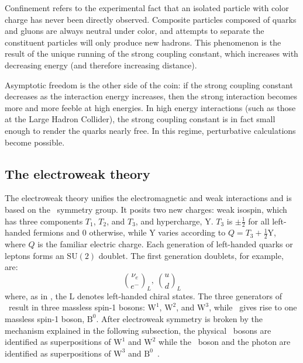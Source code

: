 Confinement refers to the experimental fact that an isolated particle with color charge has never been directly observed. Composite particles composed of quarks and gluons are always neutral under color, and attempts to separate the constituent particles will only produce new hadrons. This phenomenon is the result of the unique running of the strong coupling constant, which increases with decreasing energy (and therefore increasing distance).    

Asymptotic freedom is the other side of the coin: if the strong coupling constant decreases as the interaction energy increases, then the strong interaction becomes more and more feeble at high energies. In high energy interactions (such as those at the Large Hadron Collider), the strong coupling constant is in fact small enough to render the quarks nearly free. In this regime, perturbative calculations become possible.

\subsection{The electroweak theory}
The electroweak theory unifies the electromagnetic and weak interactions and is based on the \ewsymm\ symmetry group. It posits two new charges: weak isospin, which has three components $T_{1}$, $T_{2}$, and $T_{3}$, and hypercharge, $\mathrm{Y}$. $T_{3}$ is $\pm\frac{1}{2}$ for all left-handed fermions and 0 otherwise, while $\mathrm{Y}$ varies according to $Q=T_{3}+\frac{1}{2}\mathrm{Y}$, where $Q$ is the familiar electric charge. Each generation of left-handed quarks or leptons forms an $\mathrm{SU}(2)$ doublet. The first generation doublets, for example, are:
\begin{equation}
    \binom{\nu_{e}}{e^{-}}_{L},\ \binom{u}{d}_{L}
\end{equation}
where, as in \sutwol, the $\mathrm{L}$ denotes left-handed chiral states. The three generators of \sutwol\ result in three massless spin-1 bosons: $\mathrm{W}^{1}$, $\mathrm{W}^{2}$, and $\mathrm{W}^{3}$, while \uoney\ gives rise to one massless spin-1 boson, $\mathrm{B}^{0}$. After electroweak symmetry is broken by the mechanism explained in the following subsection, the physical \PWpm\ bosons are identified as superpositions of $\mathrm{W}^{1}$ and $\mathrm{W}^{2}$ while the \cPZ\ boson and the photon are identified as superpositions of $\mathrm{W}^{3}$ and $\mathrm{B}^{0}$~\cite{weinberg_leptons}.

